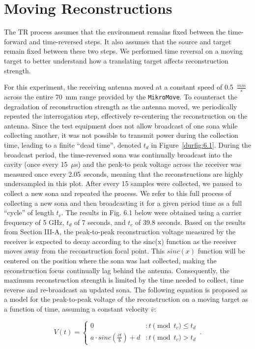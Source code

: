 \section{Moving Reconstructions}
\label{sec:moving}

The TR process assumes that the environment remains fixed between the time-forward and time-reversed steps. It also assumes that the source and target remain fixed between these two steps. We performed time reversal on a moving target to better understand how a translating target affects reconstruction strength.

For this experiment, the receiving antenna moved at a constant speed of 0.5~$\frac{mm}{s}$ across the entire 70~mm range provided by the \texttt{MikroMove}. To counteract the degradation of reconstruction strength as the antenna moved, we periodically repeated the interrogation step, effectively re-centering the reconstruction on the antenna. Since the test equipment does not allow broadcast of one sona while collecting another, it was not possible to transmit power during the collection time, leading to a finite ``dead time'', denoted $t_d$ in Figure~\ref{durfig:6.1}. During the broadcast period, the time-reversed sona was continually broadcast into the cavity (once every 15~$\mu$s) and the peak-to peak voltage across the receiver was measured once every 2.05~seconds, meaning that the reconstructions are highly undersampled in this plot. After every 15 samples were collected, we paused to collect a new sona and repeated the process. We refer to this full process of collecting a new sona and then broadcasting it for a given period time as a full ``cycle'' of length $t_c$. The results in Fig. 6.1 below were obtained using a carrier frequency of 5 GHz, $t_d$ of 7 seconds, and $t_c$ of 39.8 seconds. Based on the results from Section III-A, the peak-to-peak reconstruction voltage measured by the receiver is expected to decay according to the sinc(x) function as the receiver
moves away from the reconstruction focal point. This $sinc(x)$ function will be centered on the position where the sona was last collected, making the reconstruction focus continually lag behind the antenna. Consequently, the maximum reconstruction strength is limited by the time needed to collect, time reverse and re-broadcast an updated sona. The following equation is proposed as a model for the peak-to-peak voltage of the reconstruction on a moving target as a
function of time, assuming a constant velocity $\bar{v}$:

\begin{equation}\label{eq:vt}
  V(t) = \left\{
        \begin{array}{lr}
                0 & : t\pmod{t_c} \le t_d \\
                a\cdot sinc(\frac{\bar{v}t}{b})+d & : t\pmod{t_c} > t_d
        \end{array}\,.
  \right.
\end{equation}

